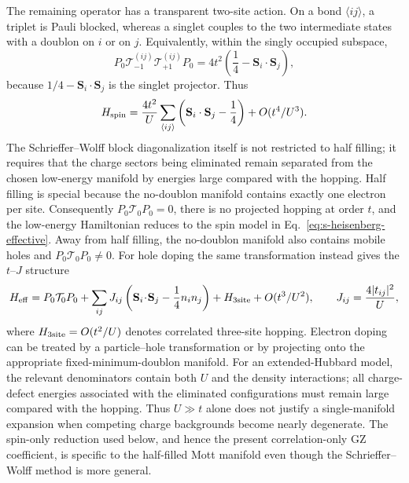 \documentclass[10pt]{article}
\begin{document}
The remaining operator has a transparent two-site action.  On a bond
$\langle ij\rangle$, a triplet is Pauli blocked, whereas a singlet couples to
the two intermediate states with a doublon on $i$ or on $j$.  Equivalently,
within the singly occupied subspace,
\begin{equation}
 P_0\mathcal T_{-1}^{(ij)}\mathcal T_{+1}^{(ij)}P_0
 =4t^2\left(\frac14-\mathbf S_i\cdot\mathbf S_j\right),
\label{eq:s-singlet-projector}
\end{equation}
because $1/4-\mathbf S_i\cdot\mathbf S_j$ is the singlet projector.  Thus
\begin{equation}
 H_{\rm spin}=\frac{4t^2}{U}\sum_{\langle ij\rangle}
 \left(\mathbf S_i\cdot\mathbf S_j-\frac14\right)
 +O(t^4/U^3).
\label{eq:s-heisenberg-effective}
\end{equation}
The Schrieffer--Wolff block diagonalization itself is not restricted to half filling; it requires that the charge sectors being eliminated remain separated from the chosen low-energy manifold by energies large compared with the hopping. Half filling is special because the no-doublon manifold contains exactly one electron per site. Consequently $P_0\mathcal T_0P_0=0$, there is no projected hopping at order $t$, and the low-energy Hamiltonian reduces to the spin model in Eq.~\ref{eq:s-heisenberg-effective}. Away from half filling, the no-doublon manifold also contains mobile holes and $P_0\mathcal T_0P_0\ne0$. For hole doping the same transformation instead gives the $t$--$J$ structure
\[
H_{\rm eff}=P_0\mathcal T_0P_0
+\sum_{ij}J_{ij}\left(\mathbf S_i\!\cdot\!\mathbf S_j
-\frac14n_in_j\right)
+H_{\rm 3site}+O(t^3/U^2),
\qquad J_{ij}=\frac{4|t_{ij}|^2}{U},
\]
where $H_{\rm 3site}=O(t^2/U)$ denotes correlated three-site hopping. Electron doping can be treated by a particle--hole transformation or by projecting onto the appropriate fixed-minimum-doublon manifold. For an extended-Hubbard model, the relevant denominators contain both $U$ and the density interactions; all charge-defect energies associated with the eliminated configurations must remain large compared with the hopping. Thus $U\gg t$ alone does not justify a single-manifold expansion when competing charge backgrounds become nearly degenerate. The spin-only reduction used below, and hence the present correlation-only GZ coefficient, is specific to the half-filled Mott manifold even though the Schrieffer--Wolff method is more general.
\end{document}
